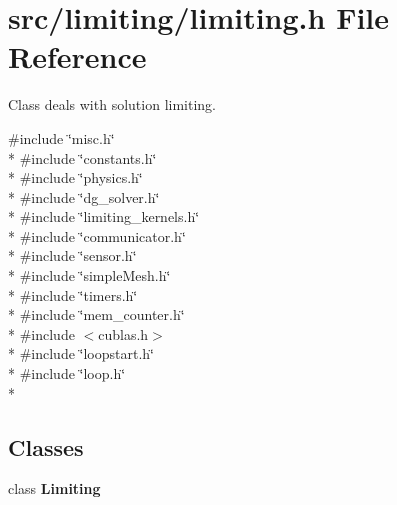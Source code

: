 \section{src/limiting/limiting.h File Reference}
\label{limiting_8h}


Class deals with solution limiting.  


{\ttfamily \#include \char`\"{}misc.\-h\char`\"{}}\\*
{\ttfamily \#include \char`\"{}constants.\-h\char`\"{}}\\*
{\ttfamily \#include \char`\"{}physics.\-h\char`\"{}}\\*
{\ttfamily \#include \char`\"{}dg\-\_\-solver.\-h\char`\"{}}\\*
{\ttfamily \#include \char`\"{}limiting\-\_\-kernels.\-h\char`\"{}}\\*
{\ttfamily \#include \char`\"{}communicator.\-h\char`\"{}}\\*
{\ttfamily \#include \char`\"{}sensor.\-h\char`\"{}}\\*
{\ttfamily \#include \char`\"{}simple\-Mesh.\-h\char`\"{}}\\*
{\ttfamily \#include \char`\"{}timers.\-h\char`\"{}}\\*
{\ttfamily \#include \char`\"{}mem\-\_\-counter.\-h\char`\"{}}\\*
{\ttfamily \#include $<$cublas.\-h$>$}\\*
{\ttfamily \#include \char`\"{}loopstart.\-h\char`\"{}}\\*
{\ttfamily \#include \char`\"{}loop.\-h\char`\"{}}\\*
\subsection*{Classes}
\begin{DoxyCompactItemize}
\item 
class {\bf Limiting}
\end{DoxyCompactItemize}
